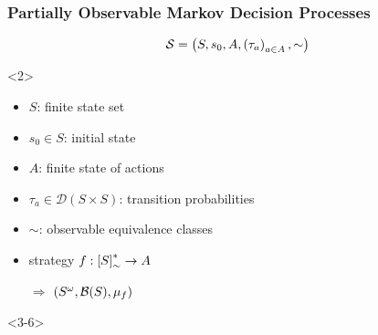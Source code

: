 \documentclass{beamer}
\begin{document}
  \begin{frame}
    \frametitle{Partially Observable Markov Decision Processes}
    \begin{equation*}
      \mathcal{S} = \left(S, s_{0}, A, \left(\tau_{a}\right)_{a\in A}, \sim\right)
    \end{equation*}
    \begin{overlayarea}{\textwidth}{0.8\textheight}
      \begin{onlyenv}<2>
        \begin{itemize}
          \item $S$: finite state set
          \item $s_{0}\in S$: initial state
          \item $A$: finite state of actions
          \item $\tau_{a}\in\mathcal{D}(S\times S)$: transition probabilities
          \item $\sim$: observable equivalence classes
          \item strategy $f:\left[S\right]_{\sim}^{*}\rightarrow A$
          \item[$\Rightarrow$] $\left(S^{\omega}, \mathcal{B}(S), \mu_{f}\right)$
        \end{itemize}
      \end{onlyenv}
      \begin{onlyenv}<3-6>
        \begin{columns}
          \begin{column}{0.6\textwidth}
          \end{column}
          \begin{column}{0.4\textwidth}
            \begin{center}

\end{center}
\end{column}
\end{columns}
\end{onlyenv}
\end{overlayarea}
\end{frame}
\end{document}
